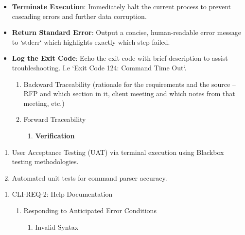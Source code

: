 \documentclass[
]{article}
\begin{document}
\begin{itemize}
\item
  \textbf{Terminate Execution}: Immediately halt the current process to
  prevent cascading errors and further data corruption.
\item
  \textbf{Return Standard Error}: Output a concise, human-readable error
  message to `stderr` which highlights exactly which step failed.
\item
  \textbf{Log the Exit Code}: Echo the exit code with brief description
  to assist troubleshooting. I.e `Exit Code 124: Command Time Out`.

  \begin{enumerate}
  \def\labelenumi{\alph{enumi}.}
  \item
    Backward Traceability (rationale for the requirements and the source
    -- RFP and which section in it, client meeting and which notes from
    that meeting, etc.)
  \item
    Forward Traceability

    \begin{enumerate}
    \def\labelenumii{\roman{enumii}.}
    \item
      \textbf{Verification}
    \end{enumerate}
  \end{enumerate}
\end{itemize}

\begin{enumerate}
\def\labelenumi{\arabic{enumi}.}
\item
  User Acceptance Testing (UAT) via terminal execution using Blackbox
  testing methodologies.
\item
  Automated unit tests for command parser accuracy.
\end{enumerate}

\begin{enumerate}
\def\labelenumi{\Roman{enumi})}
\setcounter{enumi}{1}
\item
  CLI-REQ-2: Help Documentation

  \begin{enumerate}
  \def\labelenumii{\alph{enumii}.}
  \item
    Responding to Anticipated Error Conditions

    \begin{enumerate}
    \def\labelenumiii{\roman{enumiii}.}
    \item
      Invalid Syntax
    \end{enumerate}
  \end{enumerate}
\end{enumerate}
\end{document}
